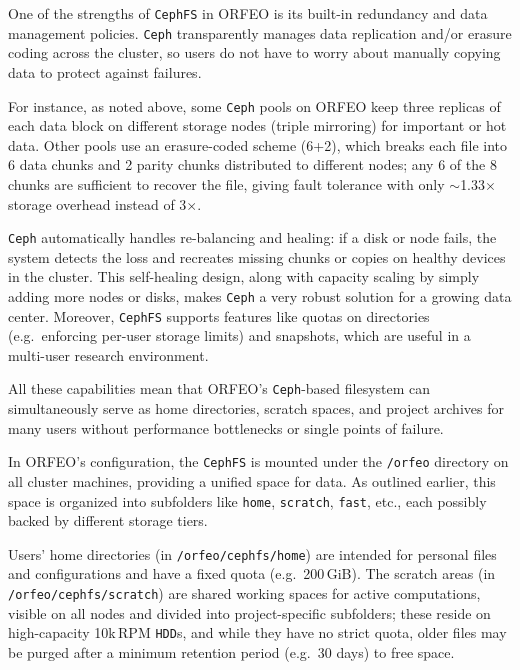 \medskip

One of the strengths of \texttt{CephFS} in ORFEO is its built-in redundancy and 
data management policies. \texttt{Ceph} transparently manages data replication 
and/or erasure coding across the cluster, so users do not have to worry about 
manually copying data to protect against failures\parencite{Ceph_Pools,Ceph_EC}. 

For instance, as noted above, some \texttt{Ceph} pools on ORFEO keep three 
replicas of each data block on different storage nodes (triple mirroring) for 
important or hot data\parencite{Ceph_Pools}. Other pools use an erasure-coded 
scheme (6+2), which breaks each file into 6 data chunks and 2 parity chunks 
distributed to different nodes; any 6 of the 8 chunks are sufficient to recover 
the file, giving fault tolerance with only $\sim$1.33$\times$ storage overhead 
instead of 3$\times$\parencite{Ceph_EC,Ceph_RADOS}. 

\texttt{Ceph} automatically handles re-balancing and healing: if a disk or node 
fails, the system detects the loss and recreates missing chunks or copies on 
healthy devices in the cluster. This self-healing design, along with capacity 
scaling by simply adding more nodes or disks, makes \texttt{Ceph} a very robust 
solution for a growing data center\parencite{Ceph_RADOS}. Moreover, 
\texttt{CephFS} supports features like quotas on directories (e.g.\ enforcing 
per-user storage limits) and snapshots, which are useful in a multi-user 
research environment\parencite{ORFEO_Docs_Storage}. 

All these capabilities mean that ORFEO’s \texttt{Ceph}-based filesystem can 
simultaneously serve as home directories, scratch spaces, and project archives 
for many users without performance bottlenecks or single points of failure.

\medskip

In ORFEO’s configuration, the \texttt{CephFS} is mounted under the 
\texttt{/orfeo} directory on all cluster machines, providing a unified space for 
data. As outlined earlier, this space is organized into subfolders like 
\texttt{home}, \texttt{scratch}, \texttt{fast}, etc., each possibly backed by 
different storage tiers\parencite{ORFEO_Docs_Storage}. 

Users’ home directories (in \texttt{/orfeo/cephfs/home}) are intended for 
personal files and configurations and have a fixed quota (e.g.\ 
200\,GiB)\parencite{ORFEO_Docs_Storage}. The scratch areas (in 
\texttt{/orfeo/cephfs/scratch}) are shared working spaces for active 
computations, visible on all nodes and divided into project-specific subfolders; 
these reside on high-capacity 10k\,RPM \texttt{HDD}s, and while they have no 
strict quota, older files may be purged after a minimum retention period (e.g.\ 
30 days) to free space\parencite{ORFEO_Docs_Storage}. 

